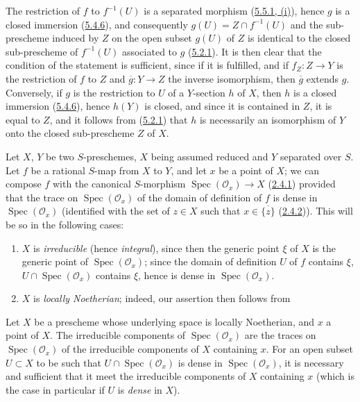 The restriction of $f$ to $f^{-1}(U)$ is a separated morphism
(\hyperref[I.5.5.1]{5.5.1, (i)}), hence $g$ is a closed immersion
(\hyperref[I.5.4.6]{5.4.6}), and consequently
$g(U)=Z\cap f^{-1}(U)$ and the sub-prescheme induced by $Z$ on the open subset
$g(U)$ of $Z$ is identical to the closed sub-prescheme of $f^{-1}(U)$
associated to $g$ (\hyperref[I.5.2.1]{5.2.1}). It is then clear that the
condition of the statement is sufficient, since if it is fulfilled, and if
$f_Z:Z\to Y$ is the restriction of $f$ to $Z$ and $\overline g:Y\to Z$ the
inverse isomorphism, then $\overline g$ extends $g$. Conversely, if $g$ is the
restriction to $U$ of a $Y$-section $h$ of $X$, then $h$ is a closed immersion
(\hyperref[I.5.4.6]{5.4.6}), hence $h(Y)$ is closed, and since it is
contained in $Z$, it is equal to $Z$, and it follows from
(\hyperref[I.5.2.1]{5.2.1}) that $h$ is necessarily an isomorphism of
$Y$ onto the closed sub-prescheme $Z$ of $X$.

\begin{env}[7.2.8]
\label{I.7.2.8}
Let $X$, $Y$ be two $S$-preschemes, $X$ being assumed reduced and $Y$
separated over $S$. Let $f$ be a rational $S$-map from $X$ to $Y$, and let
$x$ be a point of $X$; we can compose $f$ with the canonical $S$-morphism
$\operatorname{Spec}(\mathscr{O}_x)\to X$
(\hyperref[I.2.4.1]{2.4.1}) provided that the trace on
$\operatorname{Spec}(\mathscr{O}_x)$ of the domain of definition of $f$ is
dense in $\operatorname{Spec}(\mathscr{O}_x)$ (identified with the set of
$z\in X$ such that $x\in\overline{\{z\}}$
(\hyperref[I.2.4.2]{2.4.2})). This will be so in the following cases:
\begin{enumerate}
  \item[1\textsuperscript{o}] $X$ is \emph{irreducible} (hence \emph{integral}), since then
    the generic point $\xi$ of $X$ is the generic point of
    $\operatorname{Spec}(\mathscr{O}_x)$; since the domain of definition $U$
    of $f$ contains $\xi$, $U\cap\operatorname{Spec}(\mathscr{O}_x)$ contains
    $\xi$, hence is dense in $\operatorname{Spec}(\mathscr{O}_x)$.
  \item[2\textsuperscript{o}] $X$ is \emph{locally Noetherian}; indeed, our
    assertion then follows from
\end{enumerate}
\end{env}

\begin{lemma}[7.2.8.1]
\label{I.7.2.8.1}
Let $X$ be a prescheme whose underlying space is locally Noetherian, and
$x$ a point of $X$. The irreducible components of
$\operatorname{Spec}(\mathscr{O}_x)$ are the traces on
$\operatorname{Spec}(\mathscr{O}_x)$ of the irreducible components of $X$
containing $x$. For an open subset $U\subset X$ to be such that
$U\cap\operatorname{Spec}(\mathscr{O}_x)$ is dense in
$\operatorname{Spec}(\mathscr{O}_x)$, it is necessary and sufficient that it
meet the irreducible components of $X$ containing $x$ \textup{(which is the case in
particular if $U$ is \emph{dense} in $X$)}.
\end{lemma}

